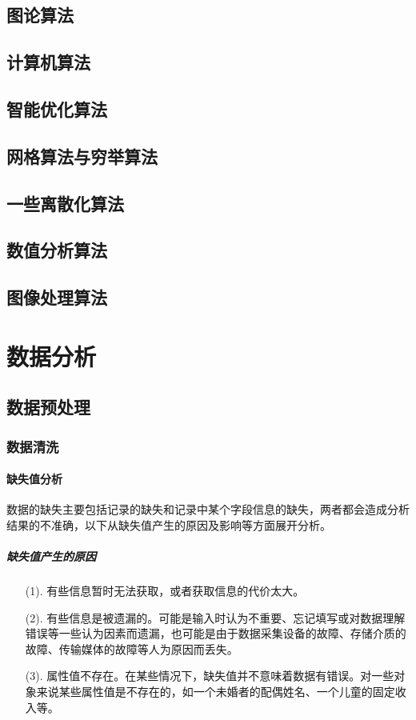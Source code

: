 \documentclass[openany]{progbookcn}
\begin{document}
\chapter{图论算法}
\chapter{计算机算法}
\chapter{智能优化算法}
\chapter{网格算法与穷举算法}
\chapter{一些离散化算法}
\chapter{数值分析算法}
\chapter{图像处理算法}


\part{数据分析}
\chapter{数据预处理}
\section{数据清洗}
\subsection{缺失值分析}
\indent 数据的缺失主要包括记录的缺失和记录中某个字段信息的缺失，两者都会造成分析结果的不准确，以下从缺失值产生的原因及影响等方面展开分析。
\subsubsection{缺失值产生的原因}
\begin{enumerate}
    \item [(1).]有些信息暂时无法获取，或者获取信息的代价太大。
    \item [(2).]有些信息是被遗漏的。可能是输入时认为不重要、忘记填写或对数据理解错误等一些认为因素而遗漏，也可能是由于数据采集设备的故障、存储介质的故障、传输媒体的故障等人为原因而丢失。
    \item [(3).]属性值不存在。在某些情况下，缺失值并不意味着数据有错误。对一些对象来说某些属性值是不存在的，如一个未婚者的配偶姓名、一个儿童的固定收入等。
\end{enumerate}
\end{document}
